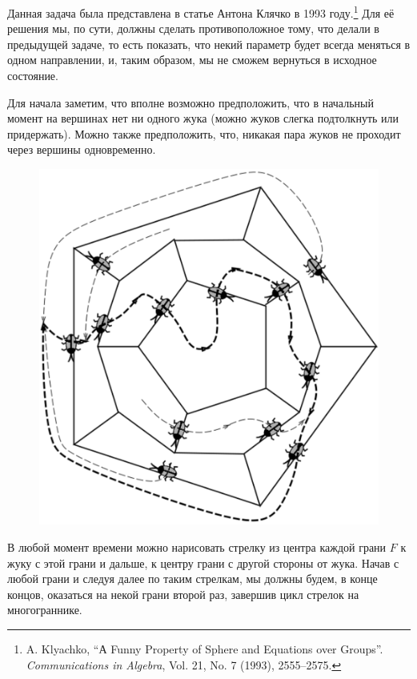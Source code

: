 Данная задача была представлена в статье Антона Клячко в 1993 году.\footnote{A. Klyachko, ``А Funny Property of Sphere and Equations over Groups''. \emph{Communications in Algebra}, Vol. 21, No. 7 (1993), 2555--2575.} 
Для её решения мы, по сути, должны сделать противоположное тому, что делали в предыдущей задаче, то есть показать, что некий параметр будет всегда меняться в одном направлении, и, таким образом, мы не сможем вернуться в исходное состояние.

\medskip

Для начала заметим, что вполне возможно предположить, что в начальный момент на вершинах нет ни одного жука (можно жуков слегка подтолкнуть или придержать).
Можно также предположить, что, никакая пара жуков не проходит через вершины одновременно.

\begin{figure}[h!]
\centering
\includegraphics[scale=0.5]{Figs/Algorithms/dodec}
\end{figure}

В любой момент времени можно нарисовать стрелку из центра каждой грани $F$ к жуку с этой грани и дальше, к центру грани с другой стороны от жука.
Начав с любой грани и следуя далее по таким стрелкам, мы должны будем, в конце концов, оказаться на некой грани второй раз, завершив цикл стрелок на многограннике.

